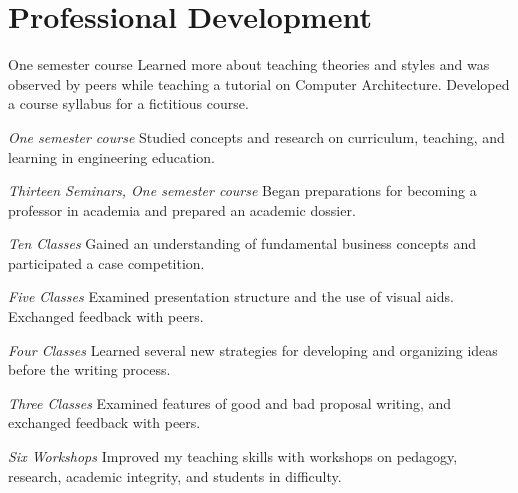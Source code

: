 \section{\sc Professional Development}

{One semester course}{ }
{
  Learned more about teaching theories and styles and was observed by peers while teaching a tutorial on Computer Architecture.
  Developed a course syllabus for a fictitious course.
}

{\em One semester course}{ }
{
  Studied concepts and research on curriculum, teaching, and learning in engineering education.
}

{\em Thirteen Seminars, One semester course}{ }
{
  Began preparations for becoming a professor in academia and prepared an academic dossier.
}

{\em Ten Classes}{ }
{
  Gained an understanding of fundamental business concepts and participated a case competition.
}

{\em Five Classes}{ }
{
  Examined presentation structure and the use of visual aids.
  Exchanged feedback with peers.
}

{\em Four Classes}{ }
{
  Learned several new strategies for developing and organizing ideas before the writing process.
}

{\em Three Classes}{ }
{
  Examined features of good and bad proposal writing, and exchanged feedback with peers.
}

{\em Six Workshops}{ }
{
  Improved my teaching skills with workshops on pedagogy, research, academic integrity, and students in difficulty.
}
